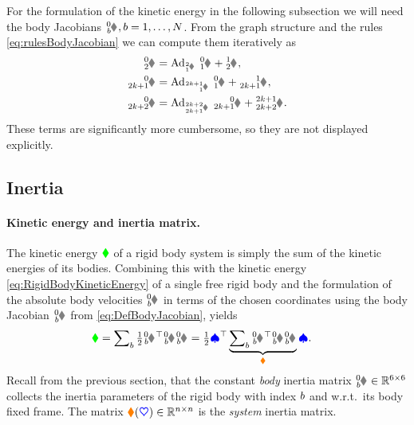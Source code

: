 \begin{Example}
For the formulation of the kinetic energy in the following subsection we will need the body Jacobians $\bodyJac{0}{\BidxII}, \BidxII=1,\ldots,\numRigidBodies$.
From the graph structure and the rules \eqref{eq:rulesBodyJacobian} we can compute them iteratively as
\begin{subequations}
\begin{align}
 \bodyJac{0}{2} &= \Ad{\bodyHomoCoord{2}{1}} \ \bodyJac{0}{1} + \bodyJac{1}{2},
\\
 \bodyJac{0}{2k+1} &= \Ad{\bodyHomoCoord{2k+1}{1}} \ \bodyJac{0}{1} + \bodyJac{1}{2k+1},
\\
 \bodyJac{0}{2k+2} &= \Ad{\bodyHomoCoord{2k+2}{2k+1}} \ \bodyJac{0}{2k+1} + \bodyJac{2k+1}{2k+2}.
\end{align}
\end{subequations}
These terms are significantly more cumbersome, so they are not displayed explicitly.
\end{Example}



\subsection{Inertia}\label{sec:RBSInertia}
\paragraph{Kinetic energy and inertia matrix.}
The kinetic energy $\textcolor{green}{\blacklozenge}$ of a rigid body system is simply the sum of the kinetic energies of its bodies.
Combining this with the kinetic energy \eqref{eq:RigidBodyKineticEnergy} of a single free rigid body and the formulation of the absolute body velocities $\bodyVel{0}{\BidxII}$ in terms of the chosen coordinates using the body Jacobian $\bodyJac{0}{\BidxII}$ from \eqref{eq:DefBodyJacobian}, yields
\begin{align}\label{eq:RBSKineticEnergy}
 \kineticEnergy
 &= \sumBodies \tfrac{1}{2} \bodyVel{0}{\BidxII}^\top \bodyInertiaMat{0}{\BidxII}\bodyVel{0}{\BidxII}
 = \tfrac{1}{2} \sysVel^\top \underbrace{\sumBodies \bodyJac{0}{\BidxII}^\top \bodyInertiaMat{0}{\BidxII} \bodyJac{0}{\BidxII}}_{\sysInertiaMat} \sysVel.
\end{align}
Recall from the previous section, that the constant \textit{body} inertia matrix $\bodyInertiaMat{0}{\BidxII} \in \RealNum^{6\times6}$ collects the inertia parameters of the rigid body with index $b$ and w.r.t.\ its body fixed frame. 
The matrix $\boldsymbol{\textcolor{orange}{\blacklozenge}}(\boldsymbol{\textcolor{blue}{\heartsuit}}) \in \mathbb{R}^{n\times n}$ is the \textit{system} inertia matrix.

